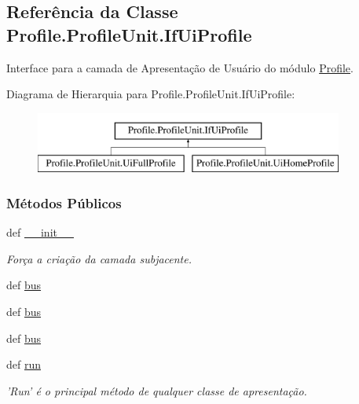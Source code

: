 \hypertarget{classProfile_1_1ProfileUnit_1_1IfUiProfile}{\subsection{Referência da Classe Profile.\-Profile\-Unit.\-If\-Ui\-Profile}
\label{classProfile_1_1ProfileUnit_1_1IfUiProfile}
}


Interface para a camada de Apresentação de Usuário do módulo \hyperlink{namespaceProfile}{Profile}.  


Diagrama de Hierarquia para Profile.\-Profile\-Unit.\-If\-Ui\-Profile\-:\begin{figure}[H]
\begin{center}
\leavevmode
\includegraphics[height=2.000000cm]{dc/d25/classProfile_1_1ProfileUnit_1_1IfUiProfile}
\end{center}
\end{figure}
\subsubsection*{Métodos Públicos}
\begin{DoxyCompactItemize}
\item 
def \hyperlink{classProfile_1_1ProfileUnit_1_1IfUiProfile_a558fbb501ee3dbc4a16d3165479c38bc}{\-\_\-\-\_\-init\-\_\-\-\_\-}
\begin{DoxyCompactList}\small\item\em Força a criação da camada subjacente. \end{DoxyCompactList}\item 
def \hyperlink{classProfile_1_1ProfileUnit_1_1IfUiProfile_ac3d0a7a780dcf729b9f3cf1fff243a78}{bus}
\item 
def \hyperlink{classProfile_1_1ProfileUnit_1_1IfUiProfile_ac3d0a7a780dcf729b9f3cf1fff243a78}{bus}
\item 
def \hyperlink{classProfile_1_1ProfileUnit_1_1IfUiProfile_ac3d0a7a780dcf729b9f3cf1fff243a78}{bus}
\item 
def \hyperlink{classProfile_1_1ProfileUnit_1_1IfUiProfile_afb22574cb4a2dc58c068437bd7075e5a}{run}
\begin{DoxyCompactList}\small\item\em 'Run' é o principal método de qualquer classe de apresentação. \end{DoxyCompactList}\end{DoxyCompactItemize}
